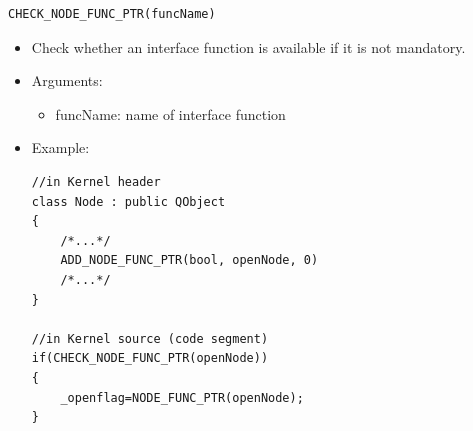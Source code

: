 \documentclass[a4paper,10pt]{book}
\begin{document}
\begin{mdframed}
\begin{verbatim}
CHECK_NODE_FUNC_PTR(funcName)
\end{verbatim}
\begin{itemize}
 \item Check whether an interface function is available if it is not mandatory.
 \item Arguments:
 \begin{itemize}
  \item funcName: name of interface function
 \end{itemize}
 \item Example: 
\begin{verbatim}
//in Kernel header
class Node : public QObject
{
    /*...*/
    ADD_NODE_FUNC_PTR(bool, openNode, 0)
    /*...*/
}

//in Kernel source (code segment)
if(CHECK_NODE_FUNC_PTR(openNode))
{
    _openflag=NODE_FUNC_PTR(openNode);
}
\end{verbatim}
\end{itemize}
\end{mdframed}
\end{document}
